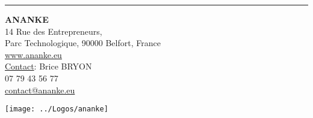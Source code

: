 \hrule
%
\vspace{1.5mm}
\noindent
\begin{minipage}{0.5\textwidth}
\textbf{ANANKE}\\ 
14 Rue des Entrepreneurs,\\
Parc Technologique, 90000 Belfort, France\\
\url{www.ananke.eu}\\
\underline{Contact}: Brice BRYON\\
\hspace*{1em}\Telefon{} 07 79 43 56 77\\
\hspace*{1em}\Letter{} \url{contact@ananke.eu}
\end{minipage}
\begin{minipage}{0.48\textwidth}
\texttt{[image: ../Logos/ananke]}
\end{minipage}
\vspace{1.5mm}




%

